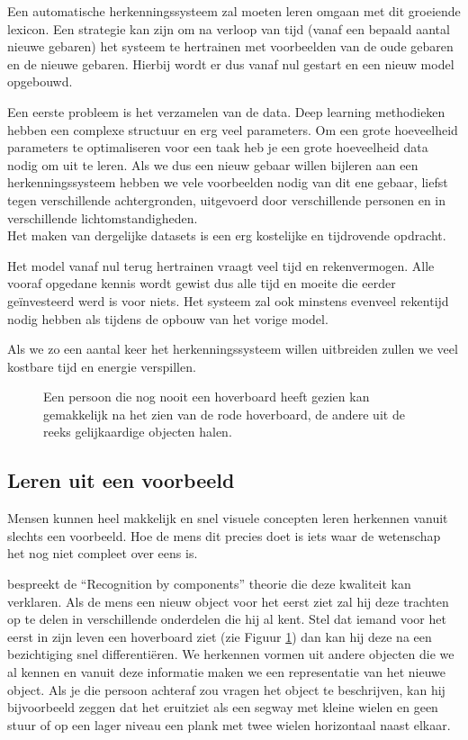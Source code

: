 \npar Een automatische herkenningssysteem zal moeten leren omgaan met dit groeiende lexicon. Een strategie kan zijn om na verloop van tijd (vanaf een bepaald aantal nieuwe gebaren) het systeem te hertrainen met voorbeelden van de oude gebaren en de nieuwe gebaren. Hierbij wordt er dus vanaf nul gestart en een nieuw model opgebouwd.

\npar Een eerste probleem is het verzamelen van de data. Deep learning methodieken hebben een complexe structuur en erg veel parameters. Om een grote hoeveelheid parameters te optimaliseren voor een taak heb je een grote hoeveelheid data nodig om uit te leren. Als we dus een nieuw gebaar willen bijleren aan een herkenningssysteem hebben we vele voorbeelden nodig van dit ene gebaar, liefst tegen verschillende achtergronden, uitgevoerd door verschillende personen en in verschillende lichtomstandigheden.
\\ Het maken van dergelijke datasets is een erg kostelijke en tijdrovende opdracht.

\npar Het model vanaf nul terug hertrainen vraagt veel tijd en rekenvermogen. Alle vooraf opgedane kennis wordt gewist dus alle tijd en moeite die eerder ge\"investeerd werd is voor niets. Het systeem zal ook minstens evenveel rekentijd nodig hebben als tijdens de opbouw van het vorige model.

\npar Als we zo een aantal keer het herkenningssysteem willen uitbreiden zullen we veel kostbare tijd en energie verspillen.

\begin{figure}[!t]
	\centering
	\def\svgscale{0.8}
	
	\caption{Een persoon die nog nooit een hoverboard heeft gezien kan gemakkelijk na het zien van de rode hoverboard, de andere uit de reeks gelijkaardige objecten halen. }\label{fig:one-shot-analogie}
\end{figure}

\subsection{Leren uit een voorbeeld}
Mensen kunnen heel makkelijk en snel visuele concepten leren herkennen vanuit slechts een voorbeeld. Hoe de mens dit precies doet is iets waar de wetenschap het nog niet compleet over eens is.

\npar \cite{recognition-components} bespreekt de ``Recognition by components'' theorie  die deze kwaliteit kan verklaren. Als de mens een nieuw object voor het eerst ziet zal hij deze trachten op te delen in verschillende onderdelen die hij al kent. Stel dat iemand voor het eerst in zijn leven een hoverboard ziet (zie Figuur \ref{fig:one-shot-analogie}) dan kan hij deze na een bezichtiging snel differenti\"eren. We herkennen vormen uit andere objecten die we al kennen en vanuit deze informatie maken we een representatie van het nieuwe object. Als je die persoon achteraf zou vragen het object te beschrijven, kan hij bijvoorbeeld zeggen dat het eruitziet als een segway met kleine wielen en geen stuur of op een lager niveau een plank met twee wielen horizontaal naast elkaar.

